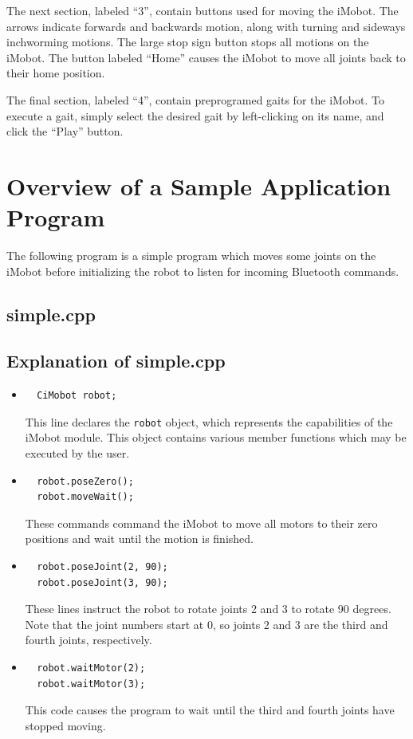 \documentclass[11pt]{report}
\begin{document}
The next section, labeled ``3'', contain buttons used for moving the iMobot. 
The arrows indicate forwards and backwards motion, along with turning and
sideways inchworming motions. The large stop sign button stops all motions
on the iMobot. The button labeled ``Home'' causes the iMobot to move all joints
back to their home position. 

The final section, labeled ``4'', contain preprogramed gaits for the iMobot.
To execute a gait, simply select the desired gait by left-clicking on its name,
and click the ``Play'' button.

\section{Overview of a Sample Application Program}
The following program is a simple program which moves some joints on the iMobot
before initializing the robot to listen for incoming Bluetooth commands.
\subsection{simple.cpp \label{subsec:simple.cpp}}
\subsection{Explanation of simple.cpp}
\begin{itemize}
\item 
\begin{verbatim}
  CiMobot robot;
\end{verbatim}
This line declares the \texttt{robot} object, which represents the
capabilities of the iMobot module. This object contains various member
functions which may be executed by the user.
\item 
\begin{verbatim}
  robot.poseZero();
  robot.moveWait();
\end{verbatim}
These commands command the iMobot to move all motors to their zero positions
and wait until the motion is finished.
\item 
\begin{verbatim}
  robot.poseJoint(2, 90);
  robot.poseJoint(3, 90);
\end{verbatim}
These lines instruct the robot to rotate joints 2 and 3 to rotate 90
degrees. Note that the joint numbers start at 0, so joints 2 and 3 are the
third and fourth joints, respectively. 
\item 
\begin{verbatim}
  robot.waitMotor(2);
  robot.waitMotor(3);
\end{verbatim}
This code causes the program to wait until the third and fourth
joints have stopped moving.
\end{itemize}
\end{document}
